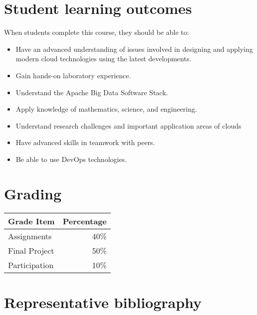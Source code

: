 \section{Student learning outcomes}

When students complete this course, they should be able to:

\begin{itemize}
\item Have an advanced understanding of issues involved in designing
  and applying modern cloud technologies using the latest
  developments.
\item	Gain hands-on laboratory experience.
\item	Understand the Apache Big Data Software Stack.
\item	Apply knowledge of mathematics, science, and engineering.
\item Understand research challenges and important application areas
  of clouds
\item	Have advanced skills in teamwork with peers.
\item Be able to use DevOps technologies.
\end{itemize}

\section{Grading}


\begin{tabular}{lr}
Grade Item	  & Percentage\\
\hline
Assignments	  & 40\% \\
Final Project	& 50\% \\
Participation	& 10\% \\
\hline
\end{tabular}



\section{Representative bibliography}

